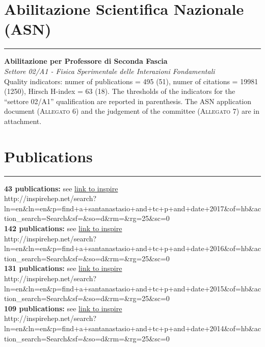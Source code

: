 \documentclass[10pt, a4paper]{article}
\newcommand{\years}[1]{\marginnote{\hskip-0.2in{\small #1}}}
\begin{document}
\section*{Abilitazione Scientifica Nazionale (ASN)}
\vspace{-5pt}
\hrule
\vspace{10pt}
\years{04/04/2017 - 04/04/2023} \textbf{Abilitazione per Professore di Seconda
Fascia}\\ 
\emph{Settore 02/A1 - Fisica Sperimentale delle Interazioni
  Fondamentali} \\[0.5em]
Quality indicators: numer of publications = 495 (51), numer of citations =
  19981 (1250), Hirsch H-index = 63 (18). The thresholds of the
  indicators for the ``settore 02/A1'' qualification are reported in parenthesis. 
  The ASN application document (\textsc{Allegato 6}) and the judgement
  of the committee (\textsc{Allegato 7}) are in attachment.

\section*{Publications}
\vspace{-5pt}
\hrule
\vspace{10pt}
\years{2017}\textbf{43 publications:} see
\href{http://inspirehep.net/search?ln=en&ln=en&p=find+a+santanastasio+and+tc+p+and+date+2017&of=hb&action_search=Search&sf=&so=d&rm=&rg=25&sc=0}{link
  to inspire}\\
{\tiny
  http://inspirehep.net/search?ln=en\&ln=en\&p=find+a+santanastasio+and+tc+p+and+date+2017\&of=hb\&action\_search=Search\&sf=\&so=d\&rm=\&rg=25\&sc=0}\\[1em]\normalsize
\years{2016}\textbf{142 publications:} see
\href{http://inspirehep.net/search?ln=en&ln=en&p=find+a+santanastasio+and+tc+p+and+date+2016&of=hb&action_search=Search&sf=&so=d&rm=&rg=25&sc=0}{link
  to inspire}\\
{\tiny
  http://inspirehep.net/search?ln=en\&ln=en\&p=find+a+santanastasio+and+tc+p+and+date+2016\&of=hb\&action\_search=Search\&sf=\&so=d\&rm=\&rg=25\&sc=0}\\[1em]\normalsize
\years{2015}\textbf{131 publications:} see
\href{http://inspirehep.net/search?ln=en&ln=en&p=find+a+santanastasio+and+tc+p+and+date+2015&of=hb&action_search=Search&sf=&so=d&rm=&rg=25&sc=0}{link
  to inspire}\\
{\tiny
  http://inspirehep.net/search?ln=en\&ln=en\&p=find+a+santanastasio+and+tc+p+and+date+2015\&of=hb\&action\_search=Search\&sf=\&so=d\&rm=\&rg=25\&sc=0}\\[1em]\normalsize
\years{2014}\textbf{109 publications:} see
\href{http://inspirehep.net/search?ln=en&ln=en&p=find+a+santanastasio+and+tc+p+and+date+2014&of=hb&action_search=Search&sf=&so=d&rm=&rg=25&sc=0}{link
  to inspire}\\
{\tiny
  http://inspirehep.net/search?ln=en\&ln=en\&p=find+a+santanastasio+and+tc+p+and+date+2014\&of=hb\&action\_search=Search\&sf=\&so=d\&rm=\&rg=25\&sc=0}\normalsize \\
\end{document}
